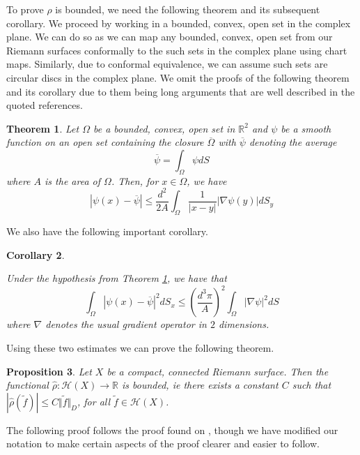 \documentclass[11pt]{report}
\newtheorem{thm}{Theorem}[section]
\newtheorem{prop}[thm]{Proposition}
\newtheorem{cor}[thm]{Corollary}
\theoremstyle{definition}
\begin{document}
To prove $\hat{\rho}$ is bounded, we need the following theorem and its subsequent corollary. We proceed by working in a bounded, convex, open set in the complex plane. We can do so as we can map any bounded, convex, open set from our Riemann surfaces conformally to the such sets in the complex plane using chart maps. Similarly, due to conformal equivalence, we can assume such sets are circular discs in the complex plane. We omit the proofs of the following theorem and its corollary due to them being long arguments that are well described in the quoted references.
\begin{thm}\cite[(p.122, Theorem 11)]{donaldson}\label{quotedTheorem11}
  Let $\Omega$ be a bounded, convex, open set in $\mathbb{R}^2$ and $\psi$ be a smooth function on an open set containing the closure $\overline{\Omega}$ with $\overline{\psi}$ denoting the average 
  \[\overline{\psi} = \int_{\Omega}\psi dS\] 
  where $A$ is the area of $\Omega$. Then, for $x \in \Omega$, we have 
  \[|\psi(x) - \overline{\psi}| \leq \frac{d^2}{2A}\int_\Omega \frac{1}{|x - y|}|\nabla\psi(y)|dS_y\]
\end{thm}
We also have the following important corollary.
\begin{cor}\cite[(p.123, Corollary 6)]{donaldson}\label{quotedCorollary6}

  Under the hypothesis from Theorem \ref{quotedTheorem11}, we have that 
  \[\int_\Omega |\psi(x) - \overline{\psi}|^2 dS_x\leq \left(\frac{d^3\pi}{A}\right)^2\int_\Omega |\nabla\psi|^2 dS\]
  where $\nabla$ denotes the usual gradient operator in $2$ dimensions.
\end{cor}
Using these two estimates we can prove the following theorem.
\begin{prop}\label{PartitionOfUnity}
  Let $X$ be a compact, connected Riemann surface. Then the functional $\hat{\rho}:\mathcal{H}(X) \rightarrow \mathbb{R}$ is bounded, ie there exists a constant $C$ such that $|\hat{\rho}(\tilde{f})|  \leq C \Vert \tilde{f} \Vert_D$, for all $\tilde{f} \in \mathcal{H}(X)$.
\end{prop}
The following proof follows the proof found on \cite[p.125]{donaldson}, though we have modified our notation to make certain aspects of the proof clearer and easier to follow.
\end{document}
